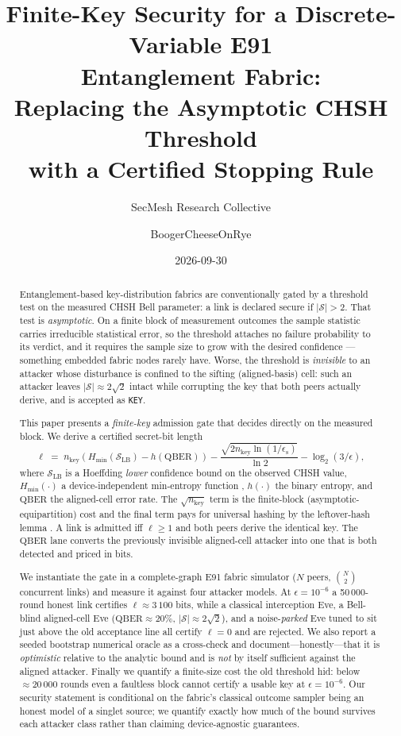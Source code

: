 \documentclass[11pt,a4paper]{article}
\title{\bf Finite-Key Security for a Discrete-Variable E91\\
Entanglement Fabric:\\
\large Replacing the Asymptotic CHSH Threshold\\
with a Certified Stopping Rule}
\author[1]{SecMesh Research Collective}
\author[2]{BoogerCheeseOnRye}
\affiliation[1]{SecMesh Labs --- open-source adversarial network security}
\affiliation[2]{Corresponding author}
\date{2026-09-30}
\newcommand{\CHSH}{\mathcal{S}}
\newcommand{\eps}{\epsilon}
\newcommand{\epsS}{\eps_{\mathrm{s}}}
\newcommand{\keylen}{n_{\mathrm{key}}}
\newcommand{\QBER}{\mathrm{QBER}}
\newcommand{\Hmin}{H_{\min}}
\newcommand{\SLB}{\mathcal{S}_{\mathrm{LB}}}
\newcommand{\bits}{\ell}
\newcommand{\bell}{2\sqrt{2}}
\theoremstyle{plain}
\theoremstyle{definition}
\begin{document}
\maketitle

\begin{abstract}
Entanglement-based key-distribution fabrics are conventionally gated by a
threshold test on the measured CHSH Bell parameter: a link is declared secure
if $|\CHSH| > 2$. That test is \emph{asymptotic}. On a finite block of
measurement outcomes the sample statistic carries irreducible statistical
error, so the threshold attaches no failure probability to its verdict, and it
requires the sample size to grow with the desired confidence --- something
embedded fabric nodes rarely have. Worse, the threshold is \emph{invisible} to
an attacker whose disturbance is confined to the sifting (aligned-basis) cell:
such an attacker leaves $|\CHSH| \approx \bell$ intact while corrupting the key
that both peers actually derive, and is accepted as \texttt{KEY}.

This paper presents a \emph{finite-key} admission gate that decides directly on
the measured block. We derive a certified secret-bit length
\begin{equation}
\bits \;=\; \keylen\!\left(\Hmin(\SLB)-h(\QBER)\right)
-\frac{\sqrt{2\keylen \ln(1/\epsS)}}{\ln 2}
-\log_2(3/\eps),
\end{equation}
where $\SLB$ is a Hoeffding \emph{lower} confidence bound on the observed CHSH
value, $\Hmin(\cdot)$ a device-independent min-entropy function
\citep{pironio2009device,acin2012device}, $h(\cdot)$ the binary entropy, and
$\QBER$ the aligned-cell error rate. The $\sqrt{\keylen}$ term is the
finite-block (asymptotic-equipartition) cost \citep{tomamichel2012finite} and
the final term pays for universal hashing by the leftover-hash lemma
\citep{leftoverhash}. A link is admitted iff $\bits \ge 1$ and both peers derive
the identical key. The $\QBER$ lane converts the previously invisible
aligned-cell attacker into one that is both detected and priced in bits.

We instantiate the gate in a complete-graph E91 fabric simulator ($N$ peers,
$\binom{N}{2}$ concurrent links) and measure it against four attacker models.
At $\eps = 10^{-6}$ a 50\,000-round honest link certifies $\bits \approx 3\,100$
bits, while a classical interception Eve, a Bell-blind aligned-cell Eve
($\QBER \approx 20\%$, $|\CHSH|\approx\bell$), and a noise-\emph{parked} Eve
tuned to sit just above the old acceptance line all certify $\bits = 0$ and are
rejected. We also report a seeded bootstrap numerical oracle as a cross-check
and document---honestly---that it is \emph{optimistic} relative to the analytic
bound and is \emph{not} by itself sufficient against the aligned attacker.
Finally we quantify a finite-size cost the old threshold hid: below
$\approx 20\,000$ rounds even a faultless block cannot certify a usable key at
$\eps = 10^{-6}$. Our security statement is conditional on the fabric's
classical outcome sampler being an honest model of a singlet source; we
quantify exactly how much of the bound survives each attacker class rather than
claiming device-agnostic guarantees.
\end{abstract}
\end{document}
